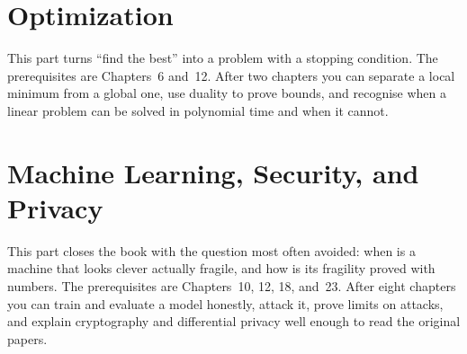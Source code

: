 \part{Optimization}

This part turns ``find the best'' into a problem with a stopping condition. The prerequisites
are Chapters~6 and~12. After two chapters you can separate a local minimum from a global one,
use duality to prove bounds, and recognise when a linear problem can be solved in polynomial
time and when it cannot.



\part{Machine Learning, Security, and Privacy}

This part closes the book with the question most often avoided: when is a machine that looks
clever actually fragile, and how is its fragility proved with numbers. The prerequisites are
Chapters~10, 12, 18, and~23. After eight chapters you can train and evaluate a model honestly,
attack it, prove limits on attacks, and explain cryptography and differential privacy well
enough to read the original papers.









\appendix





\cleardoublepage
{}
{}
\printindex





